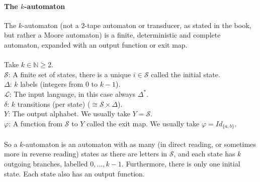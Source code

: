 \documentclass{article}
\begin{document}
\paragraph{The $k$-automaton}
The $k$-automaton (not a 2-tape automaton or transducer, as stated in the
book, but rather a Moore automaton) is a finite, deterministic and complete 
automaton, expanded with an output function or exit map.\\
\\
Take $k \in \mathbb{N} \ge 2$.\\
$\mathcal{S}$: A finite set of states, there is a unique $i \in \mathcal{S}$ 
called the initial state.\\
$\Delta$: $k$ labels (integers from 0 to $k - 1$).\\
$\mathcal{L}$: The input language, in this case always $\Delta^*$.\\
$\delta$: $k$ transitions (per state) ($\cong \mathcal{S} \times \Delta$).\\
$Y$: The output alphabet. We usually take $Y = \mathcal{S}$.\\
$\varphi$: A function from $\mathcal{S}$ to $Y$ called the exit map. We 
           usually take $\varphi = Id_{\{a, b\}}$.\\
\\
So a $k$-automaton is an automaton with as many (in direct reading, or 
sometimes more in reverse reading) states as there are letters in 
$\mathcal{S}$, and each state has $k$ outgoing branches, labelled 
$0, ..., k - 1$. Furthermore, there is only one initial state. Each state also
has an output function.
\end{document}
